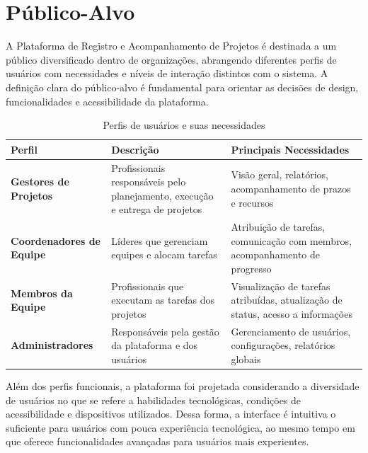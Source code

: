 \documentclass[a4paper,12pt,oneside]{article}
\begin{document}
\section{Público-Alvo}

A Plataforma de Registro e Acompanhamento de Projetos é destinada a um público diversificado dentro de organizações, abrangendo diferentes perfis de usuários com necessidades e níveis de interação distintos com o sistema. A definição clara do público-alvo é fundamental para orientar as decisões de design, funcionalidades e acessibilidade da plataforma.

\begin{table}[H]
\centering
\caption{Perfis de usuários e suas necessidades}
\label{tab:publico-alvo}
\small
\begin{tabularx}{\textwidth}{>{\bfseries}l X X}
\toprule
\textbf{Perfil} & \textbf{Descrição} & \textbf{Principais Necessidades} \\
\midrule
Gestores de Projetos & Profissionais responsáveis pelo planejamento, execução e entrega de projetos & Visão geral, relatórios, acompanhamento de prazos e recursos \\
\addlinespace
Coordenadores de Equipe & Líderes que gerenciam equipes e alocam tarefas & Atribuição de tarefas, comunicação com membros, acompanhamento de progresso \\
\addlinespace
Membros da Equipe & Profissionais que executam as tarefas dos projetos & Visualização de tarefas atribuídas, atualização de status, acesso a informações \\
\addlinespace
Administradores & Responsáveis pela gestão da plataforma e dos usuários & Gerenciamento de usuários, configurações, relatórios globais \\
\bottomrule
\end{tabularx}
\end{table}

Além dos perfis funcionais, a plataforma foi projetada considerando a diversidade de usuários no que se refere a habilidades tecnológicas, condições de acessibilidade e dispositivos utilizados. Dessa forma, a interface é intuitiva o suficiente para usuários com pouca experiência tecnológica, ao mesmo tempo em que oferece funcionalidades avançadas para usuários mais experientes.

\end{document}

